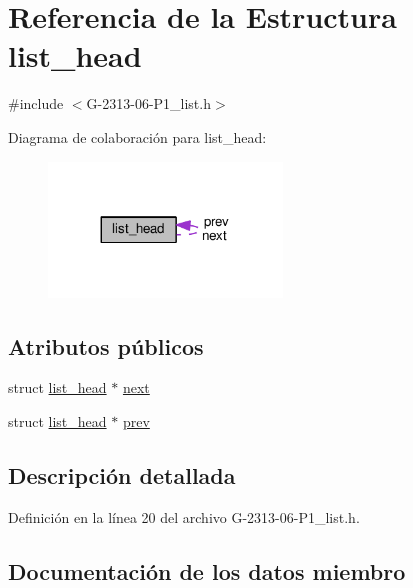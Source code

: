 \hypertarget{structlist__head}{}\section{Referencia de la Estructura list\+\_\+head}
\label{structlist__head}


{\ttfamily \#include $<$G-\/2313-\/06-\/\+P1\+\_\+list.\+h$>$}



Diagrama de colaboración para list\+\_\+head\+:\nopagebreak
\begin{figure}[H]
\begin{center}
\leavevmode
\includegraphics[width=176pt]{structlist__head__coll__graph}
\end{center}
\end{figure}
\subsection*{Atributos públicos}
\begin{DoxyCompactItemize}
\item 
struct \hyperlink{structlist__head}{list\+\_\+head} $\ast$ \hyperlink{structlist__head_ac3b0ff0dfb978a0cfbdad6b9d19cdcfe}{next}
\item 
struct \hyperlink{structlist__head}{list\+\_\+head} $\ast$ \hyperlink{structlist__head_aaa0eabda8877e1d6de73a33f223ad004}{prev}
\end{DoxyCompactItemize}


\subsection{Descripción detallada}


Definición en la línea 20 del archivo G-\/2313-\/06-\/\+P1\+\_\+list.\+h.



\subsection{Documentación de los datos miembro}
\hypertarget{structlist__head_ac3b0ff0dfb978a0cfbdad6b9d19cdcfe}{}
